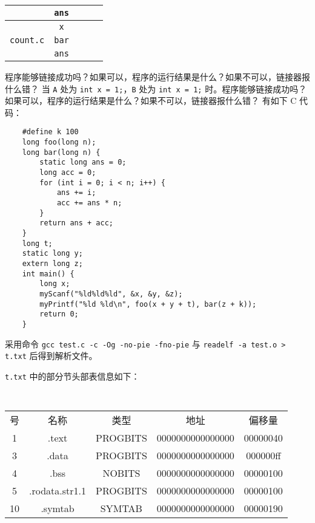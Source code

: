 \begin{problems}
\begin{table}[H]
\begin{tabular}{|c|c|c|c|c|}
                & \texttt{ans} &  &  &  \\ \hline
                \multirow{3}{*}{\texttt{count.c}} & \texttt{x} &  &  &  \\ \cline{2-5} 
                & \texttt{bar} &  &  &  \\ \cline{2-5} 
                & \texttt{ans} &  &  &  \\ \hline
            \end{tabular}
        \end{table}
        程序能够链接成功吗？如果可以，程序的运行结果是什么？如果不可以，链接器报什么错？
        \qn 当 \verb|A| 处为 \verb|int x = 1;|，\verb|B| 处为 \verb|int x = 1;| 时。程序能够链接成功吗？如果可以，程序的运行结果是什么？如果不可以，链接器报什么错？
        \pro 有如下 C 代码：
        \begin{verbatim}
    #define k 100
    long foo(long n);
    long bar(long n) {
        static long ans = 0;
        long acc = 0;
        for (int i = 0; i < n; i++) {
            ans += i;
            acc += ans * n;
        }
        return ans + acc;
    } 
    long t;
    static long y;
    extern long z;
    int main() {
        long x;
        myScanf("%ld%ld%ld", &x, &y, &z);
        myPrintf("%ld %ld\n", foo(x + y + t), bar(z + k));
        return 0;
    }
        \end{verbatim}
        采用命令 \verb|gcc test.c -c -Og -no-pie -fno-pie| 与 \verb|readelf -a test.o > t.txt| 后得到解析文件。

        \verb|t.txt| 中的部分节头部表信息如下：
        \begin{table}[H]
            \tt
            \centering
            \begin{tabular}{|ccccc|}
                \hline
                号 & 名称 & 类型 & 地址 & 偏移量 \\
                1 & .text & PROGBITS & 0000000000000000 & 00000040 \\
                3 & .data & PROGBITS & 0000000000000000 & 000000ff \\
                4 & .bss & NOBITS & 0000000000000000 & 00000100 \\
                5 & .rodata.str1.1 & PROGBITS & 0000000000000000 & 00000100 \\
                10 & .symtab & SYMTAB & 0000000000000000 & 00000190 \\ \hline
            \end{tabular}
        \end{table}


\end{problems}
